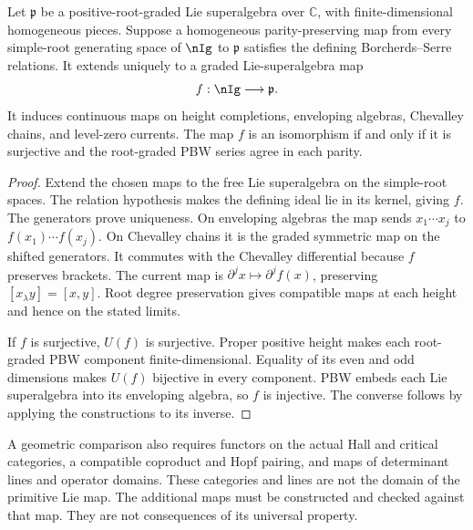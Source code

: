 \begin{theorem}
\label{igusa:primitive-presentation-map}
Let \(\mathfrak p\) be a positive-root-graded Lie superalgebra
over \(\mathbb C\), with finite-dimensional homogeneous pieces.
Suppose a homogeneous parity-preserving map from every simple-root
generating space of \(\nIg\) to \(\mathfrak p\) satisfies
the defining Borcherds--Serre relations. It extends uniquely to
a graded Lie-superalgebra map
\[
 f:\nIg\longrightarrow\mathfrak p.
\]
It induces continuous maps on height completions, enveloping
algebras, Chevalley chains, and level-zero currents. The map \(f\)
is an isomorphism if and only if it is surjective and the root-graded
PBW series agree in each parity.
\end{theorem}
\begin{proof}
Extend the chosen maps to the free Lie superalgebra on the
simple-root spaces. The relation hypothesis makes the defining
ideal lie in its kernel, giving \(f\). The generators prove
uniqueness. On enveloping algebras the map sends
\(x_1\cdots x_j\) to \(f(x_1)\cdots f(x_j)\).
On Chevalley chains it is the graded symmetric map on the shifted
generators. It commutes with the Chevalley differential because
\(f\) preserves brackets. The current map is
\(\partial^j x\mapsto\partial^j f(x)\), preserving
\([x_\lambda y]=[x,y]\). Root degree preservation gives
compatible maps at each height and hence on the stated limits.

If \(f\) is surjective, \(U(f)\) is surjective. Proper
positive height makes each root-graded PBW component
finite-dimensional. Equality of its even and odd dimensions makes
\(U(f)\) bijective in every component. PBW embeds each Lie
superalgebra into its enveloping algebra, so \(f\) is injective.
The converse follows by applying the constructions to its inverse.
\end{proof}


A geometric comparison also requires functors on the actual Hall
and critical categories, a compatible coproduct and Hopf pairing,
and maps of determinant lines and operator domains. These categories
and lines are not the domain of the primitive Lie map. The
additional maps must be constructed and checked against that map.
They are not consequences of its universal property.

